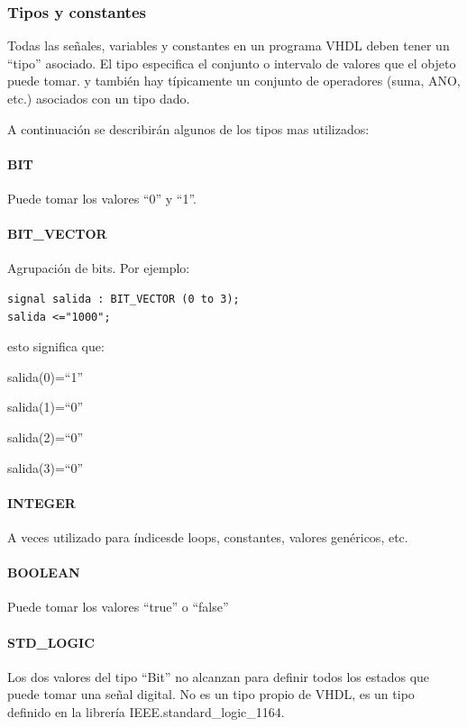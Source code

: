 \subsubsection{Tipos y constantes}

Todas las señales, variables y constantes en un programa VHDL deben tener un ``tipo''
asociado. El tipo especifica el conjunto o intervalo de valores que el objeto puede tomar.
y también hay típicamente un conjunto de operadores (suma, ANO, etc.) asociados con un tipo dado.

A continuación se describirán algunos de los tipos mas utilizados:

\paragraph{BIT}
Puede tomar los valores ``0'' y ``1''.

\paragraph{BIT\_VECTOR}
Agrupación de bits. Por ejemplo:

\begin{lstlisting}[style=vhdl]
signal salida : BIT_VECTOR (0 to 3);
salida <="1000";
\end{lstlisting}

esto significa que:

salida(0)=``1''

salida(1)=``0''

salida(2)=``0''

salida(3)=``0''

\paragraph{INTEGER}
A veces utilizado para índicesde loops, constantes, valores genéricos, etc.

\paragraph{BOOLEAN}
Puede tomar los valores ``true'' o ``false''

\paragraph{STD\_LOGIC}
Los dos valores del tipo ``Bit'' no alcanzan para definir todos los estados que puede tomar una señal digital.
No es un tipo propio de VHDL, es un tipo definido en la librería IEEE.standard\_logic\_1164.

